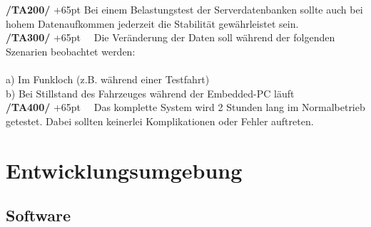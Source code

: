 \documentclass[fontsize = 12pt, paper = a4]{scrreprt}
\begin{document}
  \textbf{/TA200/} 
  \hangindent+65pt 
 \hspace*{0.2cm} Bei einem Belastungstest der Serverdatenbanken sollte auch bei hohem Daten\-auf\-kom\-men jederzeit die Stabilität gewährleistet sein. \\
  
  \textbf{/TA300/} 
  \hangindent+65pt 
  \ \ Die Veränderung der Daten soll während der folgenden Szenarien  beobachtet werden: \\ \\ a) Im Funkloch (z.B. während einer Testfahrt) \\ b) Bei Stillstand des Fahrzeuges während der \gls{Embedded-PC} läuft \\
  
 
  \textbf{/TA400/} 
  \hangindent+65pt 
\ \ Das komplette System wird 2 Stunden lang im Normalbetrieb getestet. Dabei sollten keinerlei Komplikationen oder Fehler auftreten. 
 


\chapter{Entwicklungsumgebung}

\section{Software}
\end{document}
